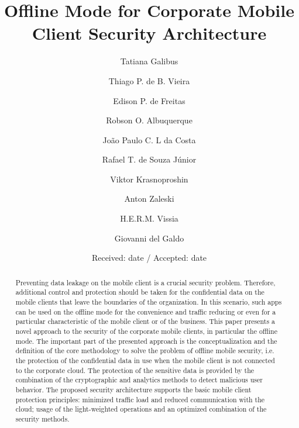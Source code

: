 \documentclass[twocolumn]{svjour3}          	%
\begin{document}
\title{Offline Mode for Corporate Mobile Client Security Architecture}

\author{Tatiana Galibus				\and
        Thiago P. de B. Vieira		\and
        	Edison P. de Freitas			\and
        	Robson O. Albuquerque		\and
        	João Paulo C. L da Costa		\and
        	Rafael T. de Souza Júnior	\and
        Viktor Krasnoproshin			\and
        	Anton Zaleski				\and
        	H.E.R.M. Vissia				\and
        	Giovanni del Galdo
}


\date{Received: date / Accepted: date}

\maketitle

\begin{abstract}
Preventing data leakage on the mobile client is a crucial security problem. Therefore, additional control and protection should be taken for the confidential data on the mobile clients that leave the boundaries of the organization. In this scenario, such apps can be used on the offline mode for the convenience and traffic reducing or even for a particular characteristic of the mobile client or of the business. This paper presents a novel approach to the security of the corporate mobile clients, in particular the offline mode. The important part of the presented approach is the conceptualization and the definition of the core methodology to solve the problem of offline mobile security, i.e. the protection of the confidential data in use when the mobile client is not connected to the corporate cloud. The protection of the sensitive data is provided by the combination of the cryptographic and analytics methods to detect malicious user behavior. The proposed security architecture supports the basic mobile client protection principles: minimized traffic load and reduced communication with the cloud; usage of the light-weighted operations and an optimized combination of the security methods.
\end{abstract}
\end{document}
